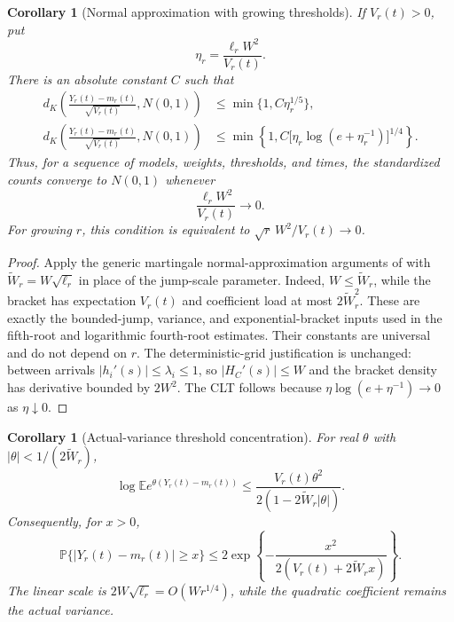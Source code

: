 \documentclass[11pt]{article}
\numberwithin{equation}{section}
\newtheorem{corollary}[theorem]{Corollary}
\theoremstyle{remark}
\begin{document}
\begin{corollary}[Normal approximation with growing thresholds]
\label{cor:sharper-threshold-normal}
If $V_r(t)>0$, put
\[
 \eta_r=\frac{\ell_rW^2}{V_r(t)}.
\]
There is an absolute constant $C$ such that
\begin{align}
 d_K\!\left(\frac{Y_r(t)-m_r(t)}{\sqrt{V_r(t)}},N(0,1)\right)
 &\le\min\{1,C\eta_r^{1/5}\},
       \label{eq:sharper-threshold-fifth}\\
 d_K\!\left(\frac{Y_r(t)-m_r(t)}{\sqrt{V_r(t)}},N(0,1)\right)
 &\le\min\!\left\{1,
 C\bigl[\eta_r\log(e+\eta_r^{-1})\bigr]^{1/4}\right\}.
       \label{eq:sharper-threshold-log}
\end{align}
Thus, for a sequence of models, weights, thresholds, and times, the
standardized counts converge to $N(0,1)$ whenever
\begin{equation}\label{eq:sharper-threshold-clt-condition}
 \frac{\ell_rW^2}{V_r(t)}\longrightarrow0.
\end{equation}
For growing $r$, this condition is equivalent to
$\sqrt r\,W^2/V_r(t)\to0$.
\end{corollary}

\begin{proof}
Apply the generic martingale normal-approximation arguments of
\cite{LongFoundation} with $\widetilde W_r=W\sqrt{\ell_r}$ in place of
the jump-scale parameter. Indeed, $W\le\widetilde W_r$, while the bracket
has expectation $V_r(t)$ and coefficient load at most
$2\widetilde W_r^2$. These are exactly the bounded-jump, variance, and
exponential-bracket inputs used in the fifth-root and logarithmic
fourth-root estimates. Their constants are universal and do not depend
on $r$. The deterministic-grid justification is unchanged: between
arrivals $|h_i'(s)|\le\lambda_i\le1$, so $|H_C'(s)|\le W$ and the
bracket density has derivative bounded by $2W^2$.
The CLT follows because $\eta\log(e+\eta^{-1})\to0$ as $\eta\downarrow0$.
\end{proof}

\begin{corollary}[Actual-variance threshold concentration]
\label{cor:sharper-threshold-concentration}
For real $\theta$ with $|\theta|<1/(2\widetilde W_r)$,
\begin{equation}\label{eq:sharper-threshold-actual-mgf}
 \log\mathbb E e^{\theta(Y_r(t)-m_r(t))}
 \le\frac{V_r(t)\theta^2}{2(1-2\widetilde W_r|\theta|)}.
\end{equation}
Consequently, for $x>0$,
\begin{equation}\label{eq:sharper-threshold-actual-tail}
 \mathbb P\{|Y_r(t)-m_r(t)|\ge x\}
 \le2\exp\!\left\{-\frac{x^2}{2(V_r(t)+2\widetilde W_rx)}\right\}.
\end{equation}
The linear scale is $2W\sqrt{\ell_r}=O(Wr^{1/4})$, while the
quadratic coefficient remains the actual variance.
\end{corollary}
\end{document}
